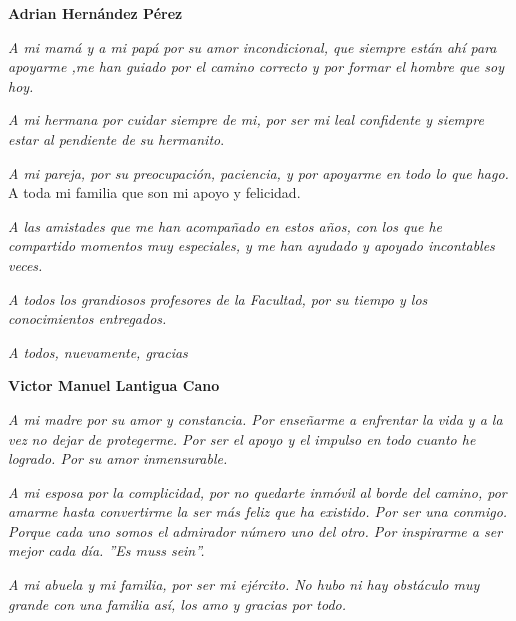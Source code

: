 \begin{acknowledgements}
	
	\begin{flushleft}
	\textbf{ {\LARGE Adrian Hernández Pérez}}
	\newline

	{\large 	\emph{A mi mamá y a mi papá por su amor incondicional, que siempre están ahí para apoyarme ,me han guiado por el camino correcto y por formar el hombre que soy hoy.}
		\newline
		
	\emph{	A mi hermana por cuidar siempre de mi, por ser mi leal confidente y siempre estar al pendiente de su hermanito}.
		\newline
		
	\emph{	A mi pareja, por su preocupación, paciencia, y por apoyarme en todo lo que hago. }
		\newline
		A toda mi familia que son mi apoyo y felicidad.
		\newline
		
	\emph{	A las amistades que me han acompañado en estos años, con los que he compartido momentos muy especiales, y me han ayudado y apoyado incontables veces.}
		\newline
		
	\emph{	A todos los grandiosos  profesores de la Facultad, por su tiempo y los conocimientos entregados.}
		\newline
		
		\emph{A todos, nuevamente, gracias}}
	
	\newpage

	\textbf{ {\LARGE Victor Manuel Lantigua Cano}}
		\newline
	
		{\large
		\emph{	A mi madre por su amor y constancia. Por enseñarme a enfrentar la vida y a la vez no dejar de protegerme. Por ser el apoyo y el impulso en todo cuanto he logrado. Por su amor inmensurable.}
			\newline
			
		\emph{	A mi esposa por la complicidad, por no quedarte inmóvil al borde del camino, por amarme hasta convertirme la ser más feliz que ha existido. Por ser una conmigo. Porque cada uno somos el admirador número uno del otro. Por inspirarme a ser mejor cada día. ''Es muss sein''.}
			\newline
	
		\emph{	A mi abuela y mi familia, por ser mi ejército. No hubo ni hay obstáculo muy grande con una familia así, los amo y gracias por todo. }
			\newline
			
}
\end{flushleft}
\end{acknowledgements}
